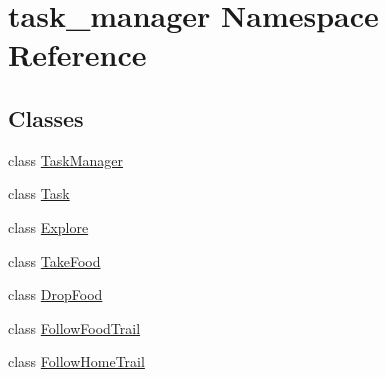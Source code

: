 \hypertarget{namespacetask__manager}{\section{task\+\_\+manager Namespace Reference}
\label{namespacetask__manager}
}
\subsection*{Classes}
\begin{DoxyCompactItemize}
\item 
class \hyperlink{classtask__manager_1_1TaskManager}{Task\+Manager}
\item 
class \hyperlink{classtask__manager_1_1Task}{Task}
\item 
class \hyperlink{classtask__manager_1_1Explore}{Explore}
\item 
class \hyperlink{classtask__manager_1_1TakeFood}{Take\+Food}
\item 
class \hyperlink{classtask__manager_1_1DropFood}{Drop\+Food}
\item 
class \hyperlink{classtask__manager_1_1FollowFoodTrail}{Follow\+Food\+Trail}
\item 
class \hyperlink{classtask__manager_1_1FollowHomeTrail}{Follow\+Home\+Trail}
\end{DoxyCompactItemize}
